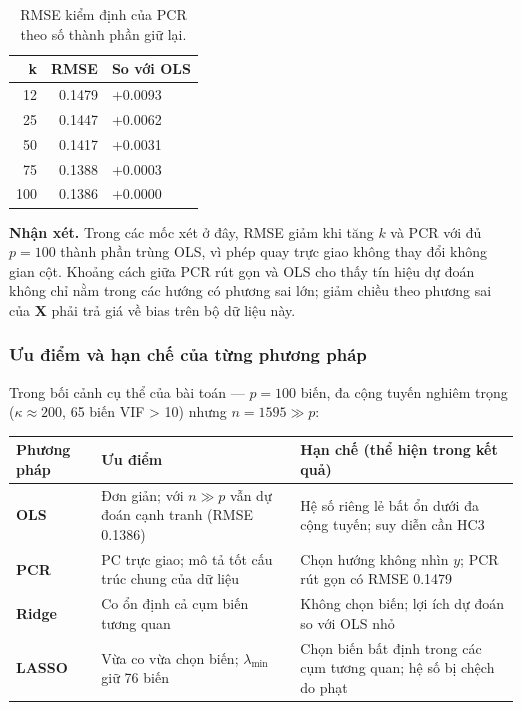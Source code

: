 \begin{longtable}[t]{rrl}
\caption{\label{tab:pcr-sensitivity}RMSE kiểm định của PCR theo số thành phần giữ lại.}\\
\toprule
k & RMSE & So với OLS\\
\midrule
12 & 0.1479 & +0.0093\\
25 & 0.1447 & +0.0062\\
50 & 0.1417 & +0.0031\\
75 & 0.1388 & +0.0003\\
100 & 0.1386 & +0.0000\\
\bottomrule
\end{longtable}

\textbf{Nhận xét.} Trong các mốc xét ở đây, RMSE giảm khi tăng \(k\) và
PCR với đủ \(p=100\) thành phần trùng OLS, vì phép quay trực giao không
thay đổi không gian cột. Khoảng cách giữa PCR rút gọn và OLS cho thấy
tín hiệu dự đoán không chỉ nằm trong các hướng có phương sai lớn; giảm
chiều theo phương sai của \(\mathbf X\) phải trả giá về bias trên bộ dữ
liệu này.

\subsubsection{Ưu điểm và hạn chế của từng phương
pháp}\label{ux1b0u-ux111iux1ec3m-vuxe0-hux1ea1n-chux1ebf-cux1ee7a-tux1eebng-phux1b0ux1a1ng-phuxe1p}

Trong bối cảnh cụ thể của bài toán --- \(p = 100\) biến, đa cộng tuyến
nghiêm trọng (\(\kappa \approx 200\), 65 biến VIF \textgreater{} 10)
nhưng \(n = 1595 \gg p\):

\begin{longtable}[]{@{}
  >{\raggedright\arraybackslash}p{}
  >{\raggedright\arraybackslash}p{}
  >{\raggedright\arraybackslash}p{}@{}}
\toprule\noalign{}
\begin{minipage}[b]{\linewidth}\raggedright
Phương pháp
\end{minipage} & \begin{minipage}[b]{\linewidth}\raggedright
Ưu điểm
\end{minipage} & \begin{minipage}[b]{\linewidth}\raggedright
Hạn chế (thể hiện trong kết quả)
\end{minipage} \\
\midrule\noalign{}
\endhead
\bottomrule\noalign{}
\endlastfoot
\textbf{OLS} & Đơn giản; với \(n\gg p\) vẫn dự đoán cạnh tranh (RMSE
0.1386) & Hệ số riêng lẻ bất ổn dưới đa cộng tuyến; suy diễn cần HC3 \\
\textbf{PCR} & PC trực giao; mô tả tốt cấu trúc chung của dữ liệu & Chọn
hướng không nhìn \(y\); PCR rút gọn có RMSE 0.1479 \\
\textbf{Ridge} & Co ổn định cả cụm biến tương quan & Không chọn biến;
lợi ích dự đoán so với OLS nhỏ \\
\textbf{LASSO} & Vừa co vừa chọn biến; \(\lambda_{\min}\) giữ 76 biến &
Chọn biến bất định trong các cụm tương quan; hệ số bị chệch do phạt \\
\end{longtable}

